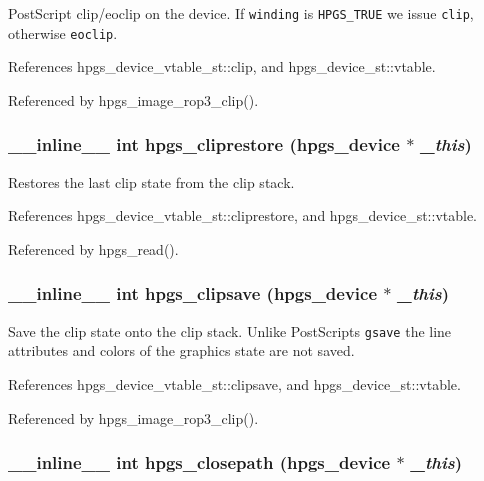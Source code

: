 PostScript clip/eoclip on the device. If {\tt winding} is {\tt HPGS\_\-TRUE} we issue {\tt clip}, otherwise {\tt eoclip}. 

References hpgs\_\-device\_\-vtable\_\-st::clip, and hpgs\_\-device\_\-st::vtable.

Referenced by hpgs\_\-image\_\-rop3\_\-clip().
\subsubsection[hpgs\_\-cliprestore]{\setlength{\rightskip}{0pt plus 5cm}\_\-\_\-inline\_\-\_\- int hpgs\_\-cliprestore ({\bf hpgs\_\-device} $\ast$ {\em \_\-this})\hspace{0.3cm}{\tt  [static]}}\label{group__device_g6a627914eb54773183a02b05db2818b4}


Restores the last clip state from the clip stack. 

References hpgs\_\-device\_\-vtable\_\-st::cliprestore, and hpgs\_\-device\_\-st::vtable.

Referenced by hpgs\_\-read().
\subsubsection[hpgs\_\-clipsave]{\setlength{\rightskip}{0pt plus 5cm}\_\-\_\-inline\_\-\_\- int hpgs\_\-clipsave ({\bf hpgs\_\-device} $\ast$ {\em \_\-this})\hspace{0.3cm}{\tt  [static]}}\label{group__device_gd4d626725fee547a5a5ab6559ad0de09}


Save the clip state onto the clip stack. Unlike PostScripts {\tt gsave} the line attributes and colors of the graphics state are not saved. 

References hpgs\_\-device\_\-vtable\_\-st::clipsave, and hpgs\_\-device\_\-st::vtable.

Referenced by hpgs\_\-image\_\-rop3\_\-clip().
\subsubsection[hpgs\_\-closepath]{\setlength{\rightskip}{0pt plus 5cm}\_\-\_\-inline\_\-\_\- int hpgs\_\-closepath ({\bf hpgs\_\-device} $\ast$ {\em \_\-this})\hspace{0.3cm}{\tt  [static]}}\label{group__device_g57e1b5cd052096b4dc60ca719a6e0f9c}


